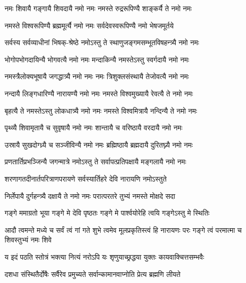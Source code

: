 


\twolineshloka
{नमः शिवायै गङ्गायै शिवदायै नमो नमः}
{नमस्ते रुद्ररूपिण्यै शाङ्कर्यै ते नमो नमः}%

\twolineshloka
{नमस्ते विश्वरूपिण्यै ब्रह्ममूर्त्यै नमो नमः}
{सर्वदेवस्वरूपिण्यै नमो भेषजमूर्तये}%

\twolineshloka
{सर्वस्य सर्वव्याधीनां भिषक्-श्रेष्ठे नमोऽस्तु ते}
{स्थाणुजङ्गमसम्भूतविषहन्त्र्यै नमो नमः}%

\twolineshloka
{भोगोपभोगदायिन्यै भोगवत्यै नमो नमः}
{मन्दाकिन्यै नमस्तेऽस्तु स्वर्गदायै नमो नमः}%

\twolineshloka
{नमस्त्रैलोक्यभूषायै जगद्धात्र्यै नमो नमः}
{नमः त्रिशुक्लसंस्थायै तेजोवत्यै नमो नमः}%

\twolineshloka
{नन्दायै लिङ्गधारिण्यै नारायण्यै नमो नमः}
{नमस्ते विश्वमुख्यायै रेवत्यै ते नमो नमः}%

\twolineshloka
{बृहत्यै ते नमस्तेऽस्तु लोकधात्र्यै नमो नमः}
{नमस्ते विश्वमित्रायै नन्दिन्यै ते नमो नमः}%

\twolineshloka
{पृथ्व्यै शिवामृतायै च सुवृषायै नमो नमः}
{शान्तायै च वरिष्ठायै वरदायै नमो नमः}%

\twolineshloka
{उस्रायै सुखदोग्ध्र्यै च सञ्जीविन्यै नमो नमः}
{ब्रह्मिष्ठायै ब्रह्मदायै दुरितघ्न्यै नमो नमः}

\twolineshloka
{प्रणतार्तिप्रभञ्जिन्यै जगन्मात्रे नमोऽस्तु ते}%
{सर्वापत्प्रतिपक्षायै मङ्गलायै नमो नमः}%

\twolineshloka
{शरणागतदीनार्तपरित्राणपरायणे}
{सर्वस्यार्तिहरे देवि नारायणि नमोऽस्तुते}%

\twolineshloka
{निर्लेपायै दुर्गहन्त्र्यै दक्षायै ते नमो नमः}
{परात्परतरे तुभ्यं नमस्ते मोक्षदे सदा}%

\twolineshloka
{गङ्गे ममाग्रतो भूया गङ्गे मे देवि पृष्ठतः}
{गङ्गे मे पार्श्वयोरेहि त्वयि गङ्गेऽस्तु मे स्थितिः}%

\threelineshloka
{आदौ त्वमन्ते मध्ये च सर्वं त्वं गां गते शुभे}
{त्वमेव मूलप्रकृतिस्त्वं हि नारायणः परः}%
{गङ्गे त्वं परमात्मा च शिवस्तुभ्यं नमः शिवे}

\twolineshloka
{य इदं पठति स्तोत्रं भक्त्या नित्यं नरोऽपि यः}%
{शृणुयाच्छ्रद्धया युक्तः कायवाक्चित्तसम्भवैः}

\twolineshloka
{दशधा  संस्थितैर्दोषैः सर्वैरेव प्रमुच्यते}%
{सर्वान्कामानवाप्नोति प्रेत्य ब्रह्मणि लीयते}

